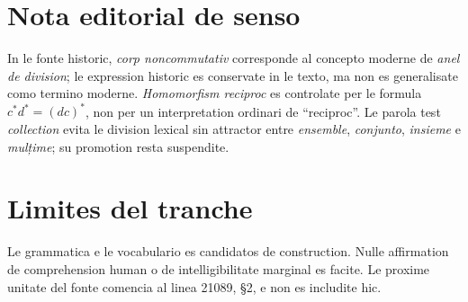 \documentclass[11pt]{article}
\begin{document}
\clearpage
\section*{Nota editorial de senso}

In le fonte historic, \emph{corp noncommutativ} corresponde al concepto moderne de \emph{anel de division}; le expression historic es conservate in le texto, ma non es generalisate como termino moderne. \emph{Homomorfism reciproc} es controlate per le formula $c^*d^*=(dc)^*$, non per un interpretation ordinari de ``reciproc''. Le parola test \emph{collection} evita le division lexical sin attractor entre \emph{ensemble}, \emph{conjunto}, \emph{insieme} e \emph{mulțime}; su promotion resta suspendite.

\section*{Limites del tranche}

Le grammatica e le vocabulario es candidatos de construction. Nulle affirmation de comprehension human o de intelligibilitate marginal es facite. Le proxime unitate del fonte comencia al linea 21089, §2, e non es includite hic.
\end{document}
